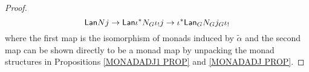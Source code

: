 \documentclass[a4paper,10pt
,draft
]{article}%
\numberwithin{equation}{section}
\numberwithin{figure}{section}
\theoremstyle{definition} %
\newcommand{\Fin}{\mathsf{F}}%
\newcommand{\1}{\ensuremath{\mathbbm 1}}%
\begin{document}
\begin{proof}
\[
	\mathsf{Lan} N j \to 
	\mathsf{Lan} \iota^{\**} N_G \iota_! j  \to
	\iota^{\**} \mathsf{Lan}_G  N_G  j_G \iota_!
\]
where the first map is the isomorphism of monads induced by $\tilde{\alpha}$ and the second map can be shown directly to be a monad map by unpacking the monad structures in 
Propositions \ref{MONADADJ1 PROP} and \ref{MONADADJ PROP}.
\end{proof}


\end{document}
